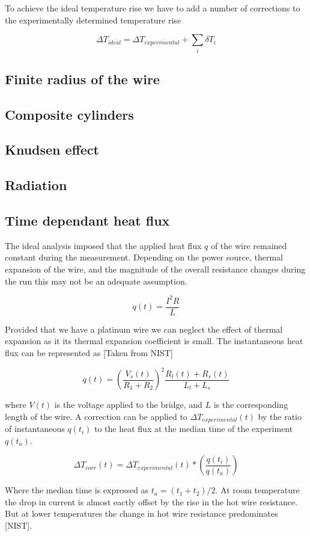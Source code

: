 \documentclass{article}
\begin{document}
To achieve the ideal temperature rise we have to add a number of corrections to the experimentally determined temperature rise

$$ \Delta T_{ideal} = \Delta T_{experimental} + \sum_{i} \delta T_i$$

\subsection{Finite radius of the wire}
\subsection{Composite cylinders}
\subsection{Knudsen effect}
\subsection{Radiation}
\subsection{Time dependant heat flux}
The ideal analysis imposed that the applied heat flux $q$ of the wire remained constant during the measurement. Depending on the power source, thermal expansion of the wire, and the magnitude of the overall resistance changes during the run this may not be an adequate assumption.

$$q(t) = \frac{I^2 R}{L}$$

Provided that we have a platinum wire we can neglect the effect of thermal expansion as it its thermal expansion coefficient is small. The instantaneous heat flux can be represented as [Taken from NIST]

$$ q(t) = \left( \frac{V_s(t)}{R_1 + R_2} \right) ^2 \frac{R_l(t) + R_s(t)}{L_l + L_s}$$

where $V(t)$ is the voltage applied to the bridge, and $L$ is the corresponding length of the wire.
A correction can be applied to $\Delta T_{experimental}(t)$ by the ratio of instantaneous $q(t_i)$ to the heat flux at the median time of the experiment $q(t_a)$.

$$\Delta T_{corr}(t) = \Delta T_{experimental}(t) * \left( \frac{q(t_i)}{q(t_a)} \right)$$

Where the median time is expressed as $t_a = (t_1 + t_2)/2$.
At room temperature the drop in current is almost eactly offset by the rise in the hot wire resistance. But at lower temperatures the change in hot wire resistance predominates [NIST].
\end{document}
